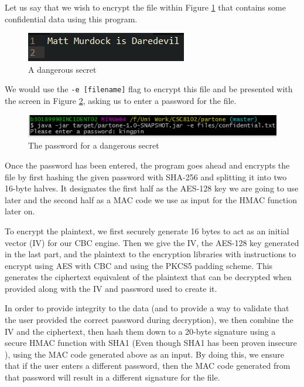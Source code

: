 \documentclass[10pt,journal,compsoc]{IEEEtran}
\begin{document}
Let us say that we wish to encrypt the file within Figure
\ref{fig:secretinformation} that contains some confidential data using this
program.

\begin{figure}[h!]
	\centering
	\includegraphics[width=0.8\linewidth]{images/secret_information}
	\caption{A dangerous secret}
	\label{fig:secretinformation}
\end{figure}

We would use the \texttt{-e [filename]} flag to encrypt this file and be
presented with the screen in Figure \ref{fig:secretpassword}, asking us to
enter a password for the file.

\begin{figure}[h!]
	\centering
	\includegraphics[width=0.9\linewidth]{images/secret_password}
	\caption{The password for a dangerous secret}
	\label{fig:secretpassword}
\end{figure}

Once the password has been entered, the program goes ahead and encrypts the
file by first hashing the given password with SHA-256 and splitting it into two
16-byte halves. It designates the first half as the AES-128 key we are going to
use later and the second half as a MAC code we use as input for the HMAC
function later on.

To encrypt the plaintext, we first securely generate 16 bytes to act as an
initial vector (IV) for our CBC engine. Then we give the IV, the AES-128 key
generated in the last part, and the plaintext to the encryption libraries with
instructions to encrypt using AES with CBC and using the PKCS5 padding scheme.
This generates the ciphertext equivalent of the plaintext that can be decrypted
when provided along with the IV and password used to create it.

In order to provide integrity to the data (and to provide a way to validate
that the user provided the correct password during decryption), we then combine
the IV and the ciphertext, then hash them down to a 20-byte signature using a
secure HMAC function with SHA1 (Even though SHA1 has been proven insecure
\cite{Wang2005}), using the MAC code generated above as an input. By doing this,
we ensure that if the user enters a different password, then the MAC code
generated from that password will result in a different signature for the file.
\end{document}
